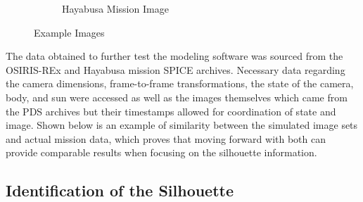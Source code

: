 \begin{figure}
\begin{subfigure}{0.23\textwidth}
         \caption{Hayabusa Mission Image}
         \label{fig:three sin x}
     \end{subfigure}
        \caption{Example Images}
        \label{fig:four_images}
\end{figure}
The data obtained to further test the modeling software was sourced from the OSIRIS-REx and Hayabusa mission SPICE archives. Necessary data regarding the camera dimensions, frame-to-frame transformations, the state of the camera, body, and sun were accessed as well as the images themselves which came from the PDS archives but their timestamps allowed for coordination of state and image. Shown below is an example of similarity between the simulated image sets and actual mission data, which proves that moving forward with both can provide comparable results when focusing on the silhouette information.



\subsection{Identification of the Silhouette}

